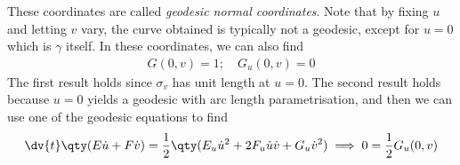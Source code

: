 These coordinates are called \textit{geodesic normal coordinates}.
Note that by fixing $u$ and letting $v$ vary, the curve obtained is typically not a geodesic, except for $u = 0$ which is $\gamma$ itself.
In these coordinates, we can also find
\begin{align*}
	G(0,v) = 1;\quad G_u(0,v) = 0
\end{align*}
The first result holds since $\sigma_v$ has unit length at $u = 0$.
The second result holds because $u = 0$ yields a geodesic with arc length parametrisation, and then we can use one of the geodesic equations to find
\begin{align*}
	\dv{t} \qty(E \dot u + F \dot v) = \frac{1}{2}\qty(E_u \dot u^2 + 2F_u \dot u \dot v + G_u \dot v^2) \implies 0 = \frac{1}{2} G_u(0,v)
\end{align*}

